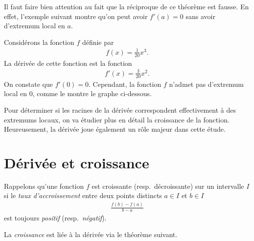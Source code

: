 \documentclass[main.tex]{subfiles}
\begin{document}
Il faut faire bien attention au fait que la réciproque de ce théorème est fausse.
En effet, l'exemple suivant montre qu'on peut avoir $f'(a) = 0$ sans avoir d'extremum local en $a$.

\begin{example}
    Considérons la fonction $f$ définie par
    \begin{align}
        f(x) = \frac 1 {20} x^3.
    \end{align}
    La dérivée de cette fonction est la fonction
    \begin{align}
        f'(x) = \frac 3 {20} x^2.
    \end{align}
    On constate que $f'(0) = 0$.
    Cependant, la fonction $f$ n'admet pas d'extremum local en $0$,
    comme le montre le graphe ci-dessous.

    \begin{plot}{0.3}{-6}{-6}{6}{6}
        \renewcommand{\f}{1/20*(\x)^3}
        \renewcommand{\der}{3/20*(\x)^2}
        \plotfunction{-6:6}{\f}
        \drawtangent{\f}{\der}{0}{-2:2}
    \end{plot}
\end{example}

Pour déterminer si les racines de la dérivée correspondent effectivement à des extremums locaux,
on va étudier plus en détail la croissance de la fonction.
Heureusement, la dérivée joue également un rôle majeur dans cette étude.

\section{Dérivée et croissance}

Rappelons qu'une fonction $f$ est croissante (resp.\ décroissante) sur un intervalle $I$
si le \emph{taux d'accroissement} entre deux points distincts $a \in I$ et $b \in I$
\begin{align}
    \frac {f(b) - f(a)} {b - a}
\end{align}
est toujours \emph{positif} (resp.\ \emph{négatif}).

La \emph{croissance} est liée à la dérivée via le théorème suivant.
\end{document}
